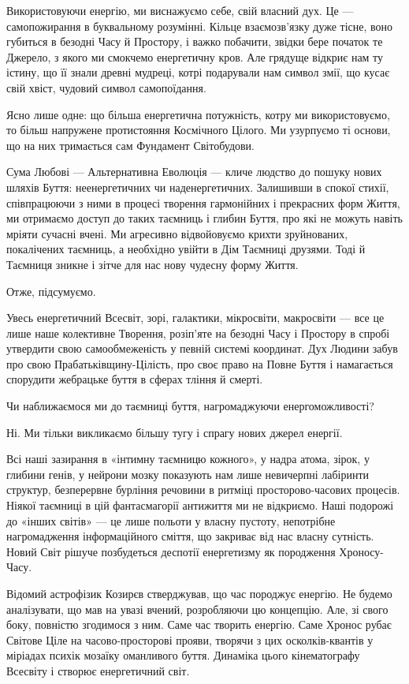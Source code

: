 Використовуючи енергію, ми виснажуємо себе, свій власний дух. Це —
самопожирання в буквальному розумінні. Кільце взаємозв’язку дуже тісне, воно
губиться в безодні Часу й Простору, і важко побачити, звідки бере початок те
Джерело, з якого ми смокчемо енергетичну кров. Але грядуще відкриє нам ту
істину, що її знали древні мудреці, котрі подарували нам символ змії, що кусає
свій хвіст, чудовий символ самопоїдання.

Ясно лише одне: що більша енергетична потужність, котру ми використовуємо, то
більш напружене протистояння Космічного Цілого. Ми узурпуємо ті основи, що на
них тримається сам Фундамент Світобудови.

Сума Любові — Альтернативна Еволюція — кличе людство до пошуку нових шляхів
Буття: неенергетичних чи наденергетичних. Залишивши в спокої стихії,
співпрацюючи з ними в процесі творення гармонійних і прекрасних форм Життя, ми
отримаємо доступ до таких таємниць і глибин Буття, про які не можуть навіть
мріяти сучасні вчені. Ми агресивно відвойовуємо крихти зруйнованих, покалічених
таємниць, а необхідно увійти в Дім Таємниці друзями. Тоді й Таємниця зникне і
зітче для нас нову чудесну форму Життя.

Отже, підсумуємо.

Увесь енергетичний Всесвіт, зорі, галактики, мікросвіти, макросвіти — все це
лише наше колективне Творення, розіп’яте на безодні Часу і Простору в спробі
утвердити свою самообмеженість у певній системі координат. Дух Людини забув про
свою Прабатьківщину-Цілість, про своє право на Повне Буття і намагається
спорудити жебрацьке буття в сферах тління й смерті.

Чи наближаємося ми до таємниці буття, нагромаджуючи енергоможливості?

Ні. Ми тільки викликаємо більшу тугу і спрагу нових джерел енергії.

Всі наші зазирання в «інтимну таємницю кожного», у надра атома, зірок, у
глибини генів, у нейрони мозку показують нам лише невичерпні лабіринти
структур, безперервне бурління речовини в ритміці просторово-часових процесів.
Ніякої таємниці в цій фантасмагорії антижиття ми не відкриємо. Наші подорожі до
«інших світів» — це лише польоти у власну пустоту, непотрібне нагромадження
інформаційного сміття, що закриває від нас власну сутність. Новий Світ рішуче
позбудеться деспотії енергетизму як породження Хроносу-Часу.

Відомий астрофізик Козирєв стверджував, що час породжує енергію. Не будемо
аналізувати, що мав на увазі вчений, розробляючи цю концепцію. Але, зі свого
боку, повністю згодимося з ним. Саме час творить енергію. Саме Хронос рубає
Світове Ціле на часово-просторові прояви, творячи з цих осколків-квантів у
міріадах психік мозаїку оманливого буття. Динаміка цього кінематографу Всесвіту
і створює енергетичний світ.

